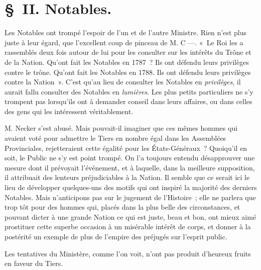 \documentclass[french,twoside]{book} %
\begin{document}
\section[{§ II. Notables.}]{§ II. Notables.}
\noindent Les Notables ont trompé l’espoir de l’un et de l’autre Ministre. Rien n’est plus juste à leur égard, que l’excellent coup de pinceau de M. C —. « Le Roi les a rassemblés deux fois autour de lui pour les consulter sur les intérêts du Trône et de la Nation. Qu’ont fait les Notables en 1787 ? Ils ont défendu leurs privilèges contre le trône. Qu’ont fait les Notables en 1788. Ils ont défendu leurs privilèges contre la Nation ». C’est qu’au lieu de consulter les Notables en {\itshape privilèges}, il aurait fallu consulter des Notables en {\itshape lumières}. Les plus petits particuliers ne s’y trompent pas lorsqu’ils ont à demander conseil dans leurs affaires, ou dans celles des gens qui les intéressent véritablement.\par
M. Necker s’est abusé. Mais pouvait-il imaginer que ces mêmes hommes qui avaient voté pour admettre le Tiers en nombre égal dans les Assemblées Provinciales, rejetteraient cette égalité pour les États-Généraux ? Quoiqu’il en soit, le Public ne s’y est point trompé. On l’a toujours entendu désapprouver une mesure dont il prévoyait l’événement, et à laquelle, dans la meilleure supposition, il attribuait des lenteurs préjudiciables à la Nation. Il semble que ce serait ici le lieu de développer quelques-uns des motifs qui ont inspiré la majorité des derniers Notables. Mais n’anticipons pas sur le jugement de l’Histoire ; elle ne parlera que trop tôt pour des hommes qui, placés dans la plus belle des circonstances, et pouvant dicter à une grande Nation ce qui est juste, beau et bon, ont mieux aimé prostituer cette superbe occasion à un misérable intérêt de corps, et donner à la postérité un exemple de plus de l’empire des préjugés sur l’esprit public.\par
Les tentatives du Ministère, comme l’on voit, n’ont pas produit d’heureux fruits en faveur du Tiers.
\end{document}
